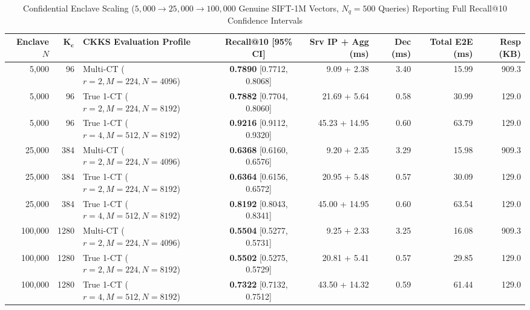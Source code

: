 \documentclass[10pt,journal,compsoc]{IEEEtran}
\begin{document}
\begin{table}[!t]
\centering
\caption{Confidential Enclave Scaling ($5,000 \to 25,000 \to 100,000$ Genuine SIFT-1M Vectors, $N_q=500$ Queries) Reporting Full Recall@10 Confidence Intervals}
\label{tab:ckks_scale}
\footnotesize
\begin{adjustbox}{max width=\textwidth}
\begin{tabular}{rrlcrrrr}
\toprule
\textbf{Enclave $N$} & $\boldsymbol{K_c}$ & \textbf{CKKS Evaluation Profile} & \textbf{Recall@10 [95\% CI]} & \textbf{Srv IP + Agg (ms)} & \textbf{Dec (ms)} & \textbf{Total E2E (ms)} & \textbf{Resp (KB)} \\
\midrule
5,000 & 96 & Multi-CT ($r=2, M=224, N=4096$) & \textbf{0.7890} [0.7712, 0.8068] & 9.09 + 2.38 & 3.40 & 15.99 & 909.3 \\
5,000 & 96 & True 1-CT ($r=2, M=224, N=8192$) & \textbf{0.7882} [0.7704, 0.8060] & 21.69 + 5.64 & 0.58 & 30.99 & 129.0 \\
5,000 & 96 & True 1-CT ($r=4, M=512, N=8192$) & \textbf{0.9216} [0.9112, 0.9320] & 45.23 + 14.95 & 0.60 & 63.79 & 129.0 \\
\midrule
25,000 & 384 & Multi-CT ($r=2, M=224, N=4096$) & \textbf{0.6368} [0.6160, 0.6576] & 9.20 + 2.35 & 3.29 & 15.98 & 909.3 \\
25,000 & 384 & True 1-CT ($r=2, M=224, N=8192$) & \textbf{0.6364} [0.6156, 0.6572] & 20.95 + 5.48 & 0.57 & 30.09 & 129.0 \\
25,000 & 384 & True 1-CT ($r=4, M=512, N=8192$) & \textbf{0.8192} [0.8043, 0.8341] & 45.00 + 14.95 & 0.60 & 63.54 & 129.0 \\
\midrule
100,000 & 1280 & Multi-CT ($r=2, M=224, N=4096$) & \textbf{0.5504} [0.5277, 0.5731] & 9.25 + 2.33 & 3.25 & 16.08 & 909.3 \\
100,000 & 1280 & True 1-CT ($r=2, M=224, N=8192$) & \textbf{0.5502} [0.5275, 0.5729] & 20.81 + 5.41 & 0.57 & 29.85 & 129.0 \\
100,000 & 1280 & True 1-CT ($r=4, M=512, N=8192$) & \textbf{0.7322} [0.7132, 0.7512] & 43.50 + 14.32 & 0.59 & 61.44 & 129.0 \\
\bottomrule
\end{tabular}
\end{adjustbox}
\end{table}
\end{document}
